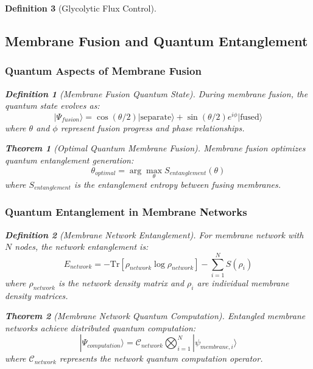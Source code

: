 \documentclass[12pt,a4paper]{article}
\newtheorem{theorem}{Theorem}
\newtheorem{definition}{Definition}
\begin{document}
\begin{definition}[Glycolytic Flux Control]
\subsection{Membrane Fusion and Quantum Entanglement}

\subsubsection{Quantum Aspects of Membrane Fusion}

\begin{definition}[Membrane Fusion Quantum State]
During membrane fusion, the quantum state evolves as:
\begin{equation}
|\Psi_{fusion}\rangle = \cos(\theta/2) |\text{separate}\rangle + \sin(\theta/2) e^{i\phi} |\text{fused}\rangle
\end{equation}
where $\theta$ and $\phi$ represent fusion progress and phase relationships.
\end{definition}

\begin{theorem}[Optimal Quantum Membrane Fusion]
Membrane fusion optimizes quantum entanglement generation:
\begin{equation}
\theta_{optimal} = \arg\max_{\theta} S_{entanglement}(\theta)
\end{equation}
where $S_{entanglement}$ is the entanglement entropy between fusing membranes.
\end{theorem}

\subsubsection{Quantum Entanglement in Membrane Networks}

\begin{definition}[Membrane Network Entanglement]
For membrane network with $N$ nodes, the network entanglement is:
\begin{equation}
E_{network} = -\text{Tr}[\rho_{network} \log \rho_{network}] - \sum_{i=1}^{N} S(\rho_i)
\end{equation}
where $\rho_{network}$ is the network density matrix and $\rho_i$ are individual membrane density matrices.
\end{definition}

\begin{theorem}[Membrane Network Quantum Computation]
Entangled membrane networks achieve distributed quantum computation:
\begin{equation}
|\Psi_{computation}\rangle = \mathcal{C}_{network} \bigotimes_{i=1}^{N} |\psi_{membrane,i}\rangle
\end{equation}
where $\mathcal{C}_{network}$ represents the network quantum computation operator.
\end{theorem}


\end{definition}
\end{document}
